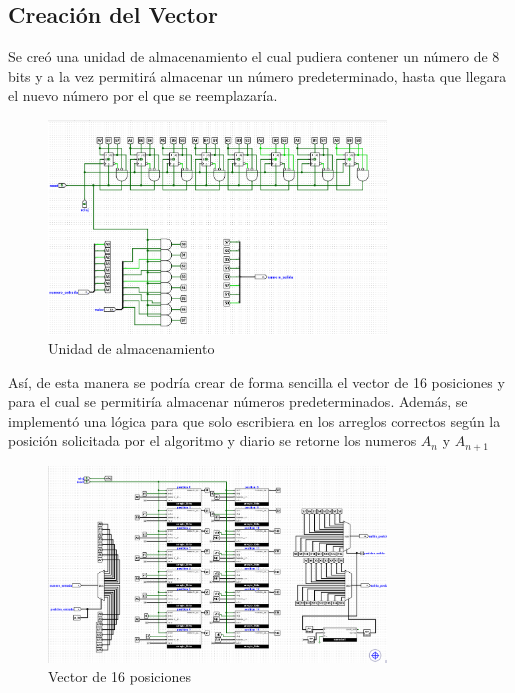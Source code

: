 \documentclass{article}
\begin{document}
\subsection{Creación del Vector}
Se creó una unidad de almacenamiento el cual pudiera contener un número de 8 bits y a la vez 
permitirá almacenar un número predeterminado, hasta que llegara el nuevo número por el que se reemplazaría.
\begin{figure}[h] %
    \centering
    \includegraphics[width=0.8\textwidth]{imagenes/unidad_almacenamiento.png} %
    \caption{Unidad de almacenamiento} %
    \label{fig:arreglo} %
\end{figure}

Así, de esta manera se podría crear de forma sencilla el vector de 16 posiciones y para el cual se permitiría 
almacenar números predeterminados. Además, se implementó una lógica para que solo escribiera en los arreglos 
correctos según la posición solicitada por el algoritmo y diario se retorne los numeros $A_n$ y $A_{n+1}$

\begin{figure}[h] %
    \centering
    \includegraphics[width=0.8\textwidth]{imagenes/vector.png} %
    \caption{Vector de 16 posiciones} %
    \label{fig:arreglofull} %
\end{figure}
\newpage
\end{document}
